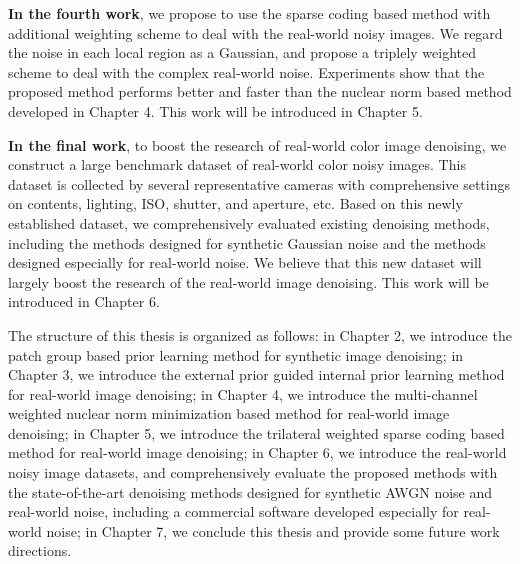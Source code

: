 \textbf{In the fourth work}, we propose to use the sparse coding based method with additional weighting scheme to deal with the real-world noisy images. We regard the noise in each local region as a Gaussian, and propose a triplely weighted scheme to deal with the complex real-world noise. Experiments show that the proposed method performs better and faster than the nuclear norm based method developed in Chapter 4. This work will be introduced in Chapter 5.


\textbf{In the final work}, to boost the research of real-world color image denoising, we construct a large benchmark dataset of real-world color noisy images. This dataset is collected by several representative cameras with comprehensive settings on contents, lighting, ISO, shutter, and aperture, etc. Based on this newly established dataset, we comprehensively evaluated existing denoising methods, including the methods designed for synthetic Gaussian noise and the methods designed especially for real-world noise. We believe that this new dataset will largely boost the research of the real-world image denoising. This work will be introduced in Chapter 6.


The structure of this thesis is organized as follows: in Chapter 2, we introduce the patch group based prior learning method for synthetic image denoising; in Chapter 3, we introduce the external prior guided internal prior learning method for real-world image denoising; in Chapter 4, we introduce the multi-channel weighted nuclear norm minimization based method for real-world image denoising; in Chapter 5, we introduce the trilateral weighted sparse coding based method for real-world image denoising; in Chapter 6, we introduce the real-world noisy image datasets, and comprehensively evaluate the proposed methods with the state-of-the-art denoising methods designed for synthetic AWGN noise and real-world noise, including a commercial software developed especially for real-world noise; in Chapter 7, we conclude this thesis and provide some future work directions.






